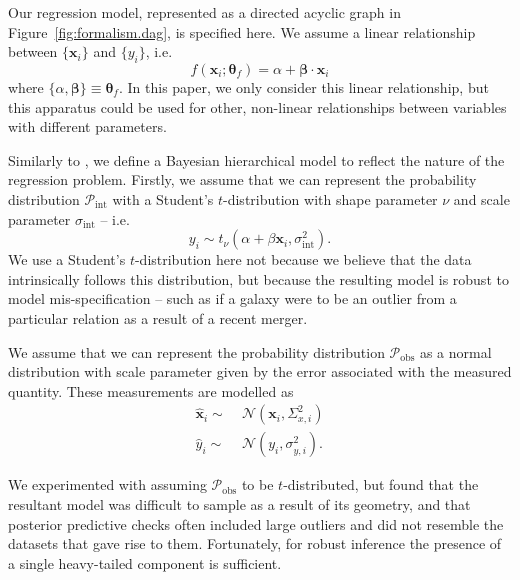 \documentclass[fleqn,usenatbib]{rasti}
\newcommand{\studentt}[2]{t_\nu \left( #1, #2 \right)}
\newcommand{\depvar}{y_i}
\newcommand{\indepvars}{\boldsymbol{x}_i}
\newcommand{\obsdep}{\hat{y}_i}
\newcommand{\obsindep}{\hat{\boldsymbol{x}}_i}
\newcommand{\indepcov}{\Sigma_{x, i}}
\newcommand{\deperr}{\sigma_{y, i}}
\newcommand{\intscttr}{\sigma_{\text{int}}}
\newcommand{\intercept}{\alpha}
\newcommand{\covariate}{\beta}
\begin{document}
Our regression model, represented as a directed acyclic graph in
Figure~\ref{fig:formalism.dag}, is specified here. We assume a linear
relationship between
$\{\boldsymbol{x}_i\}$ and $\{y_i\}$, i.e.\
\begin{equation}
    f(\boldsymbol{x}_i; \boldsymbol{\theta}_f) =
        \alpha + \boldsymbol{\beta} \cdot \boldsymbol{x}_i
\end{equation}
where $\{\alpha, \boldsymbol{\beta}\} \equiv \boldsymbol{\theta}_f$. In this
paper, we only consider this linear relationship, but this apparatus could be
used for other, non-linear relationships between variables with different
parameters.

Similarly to \citet{Kelly:2007}, we define a Bayesian hierarchical model to
reflect the nature of the regression problem. Firstly, we assume that we can
represent the probability distribution $\mathcal P_{\text{int}}$ with a
Student's $t$-distribution with shape parameter $\nu$ and scale parameter
$\sigma_{\text{int}}$ -- i.e.\
\begin{equation}
    \depvar \sim \studentt{\intercept + \covariate \indepvars}{\intscttr^2}.
\end{equation}
We use a Student's $t$-distribution here not because we believe that the data
intrinsically follows this distribution, but because the resulting model is
robust to model mis-specification -- such as if a galaxy were
to be an outlier from a particular relation as a result of a recent merger.

We assume that we can represent the probability distribution
$\mathcal P_{\text{obs}}$ as a normal distribution with scale parameter given by
the error associated with the measured quantity. These measurements are modelled
as
\begin{align}
    \obsindep \sim&\; \mathcal N\left({\indepvars}, \indepcov^2\right) \\
    \obsdep \sim&\; \mathcal N\left({\depvar}, \deperr^2\right).
\end{align}

We experimented with assuming $\mathcal P_{\text{obs}}$ to be $t$-distributed,
but found that the resultant model was difficult to sample as a result of its
geometry, and that posterior predictive checks often included large outliers and
did not resemble the datasets that gave rise to them.  Fortunately, for robust
inference the presence of a single heavy-tailed component is sufficient.
\end{document}
